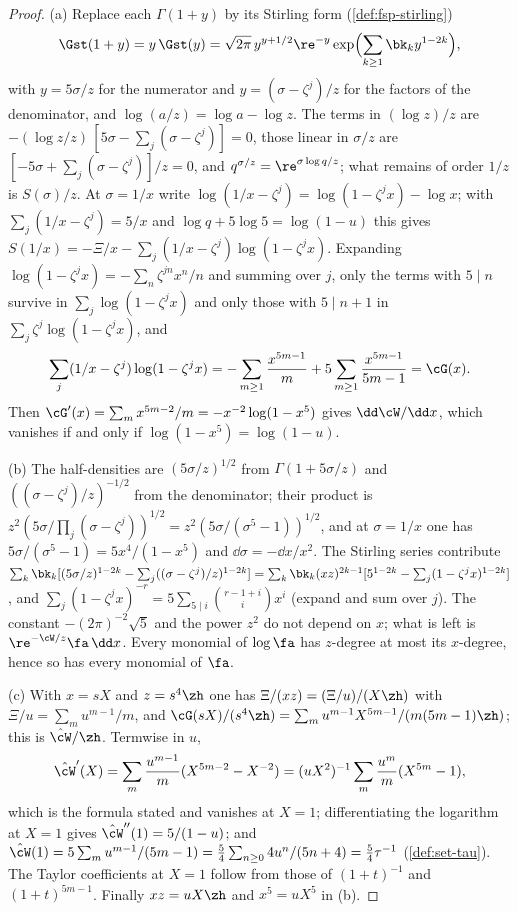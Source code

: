 
\begin{proof}
(a) Replace each $\Gamma(1+y)$ by its Stirling form (\cref{def:fsp-stirling})
\[
\Gst(1+y)=y\,\Gst(y)=\sqrt{2\pi}\,y^{y+1/2}\re^{-y}\exp\Bigl(\sum_{k\geq1}\bk_ky^{1-2k}\Bigr),
\]
with $y=5\sigma/z$ for the numerator and $y=(\sigma-\zeta^j)/z$ for the factors of the denominator, and $\log(a/z)=\log a-\log z$. The terms in $(\log z)/z$ are $-(\log z/z)\,[5\sigma-\sum_j(\sigma-\zeta^j)]=0$, those linear in $\sigma/z$ are $[-5\sigma+\sum_j(\sigma-\zeta^j)]/z=0$, and $q^{\sigma/z}=\re^{\sigma\log q/z}$; what remains of order $1/z$ is $S(\sigma)/z$. At $\sigma=1/x$ write $\log(1/x-\zeta^j)=\log(1-\zeta^jx)-\log x$; with $\sum_j(1/x-\zeta^j)=5/x$ and $\log q+5\log5=\log(1-u)$ this gives $S(1/x)=-\Xi/x-\sum_j(1/x-\zeta^j)\log(1-\zeta^jx)$. Expanding $\log(1-\zeta^jx)=-\sum_n\zeta^{jn}x^n/n$ and summing over $j$, only the terms with $5\mid n$ survive in $\sum_j\log(1-\zeta^jx)$ and only those with $5\mid n+1$ in $\sum_j\zeta^j\log(1-\zeta^jx)$, and
\[
\sum_j(1/x-\zeta^j)\log(1-\zeta^jx)=-\sum_{m\geq1}\frac{x^{5m-1}}m+5\sum_{m\geq1}\frac{x^{5m-1}}{5m-1}=\cG(x).
\]
Then $\cG'(x)=\sum_mx^{5m-2}/m=-x^{-2}\log(1-x^5)$ gives $\dd\cW/\dd x$, which vanishes if and only if $\log(1-x^5)=\log(1-u)$.

(b) The half-densities are $(5\sigma/z)^{1/2}$ from $\Gamma(1+5\sigma/z)$ and $((\sigma-\zeta^j)/z)^{-1/2}$ from the denominator; their product is $z^2(5\sigma/\prod_j(\sigma-\zeta^j))^{1/2}=z^2(5\sigma/(\sigma^5-1))^{1/2}$, and at $\sigma=1/x$ one has $5\sigma/(\sigma^5-1)=5x^4/(1-x^5)$ and $\dd\sigma=-\dd x/x^2$. The Stirling series contribute $\sum_k\bk_k[(5\sigma/z)^{1-2k}-\sum_j((\sigma-\zeta^j)/z)^{1-2k}]=\sum_k\bk_k(xz)^{2k-1}[5^{1-2k}-\sum_j(1-\zeta^jx)^{1-2k}]$, and $\sum_j(1-\zeta^jx)^{-r}=5\sum_{5\mid i}\binom{r-1+i}{i}x^i$ (expand and sum over $j$). The constant $-(2\pi)^{-2}\sqrt5$ and the power $z^2$ do not depend on $x$; what is left is $\re^{-\cW/z}\fa\,\dd x$. Every monomial of $\log\fa$ has $z$-degree at most its $x$-degree, hence so has every monomial of $\fa$.

(c) With $x=sX$ and $z=s^4\zh$ one has $\Xi/(xz)=(\Xi/u)/(X\zh)$ with $\Xi/u=\sum_mu^{m-1}/m$, and $\cG(sX)/(s^4\zh)=\sum_mu^{m-1}X^{5m-1}/(m(5m-1)\zh)$; this is $\hat\cW/\zh$. Termwise in $u$,
\[
\hat\cW'(X)=\sum_m\frac{u^{m-1}}m(X^{5m-2}-X^{-2})=(uX^2)^{-1}\sum_m\frac{u^m}m(X^{5m}-1),
\]
which is the formula stated and vanishes at $X=1$; differentiating the logarithm at $X=1$ gives $\hat\cW''(1)=5/(1-u)$; and $\hat\cW(1)=5\sum_mu^{m-1}/(5m-1)=\frac54\sum_{n\geq0}4u^n/(5n+4)=\frac54\tau^{-1}$ (\cref{def:set-tau}). The Taylor coefficients at $X=1$ follow from those of $(1+t)^{-1}$ and $(1+t)^{5m-1}$. Finally $xz=uX\zh$ and $x^5=uX^5$ in (b).


\end{proof}
